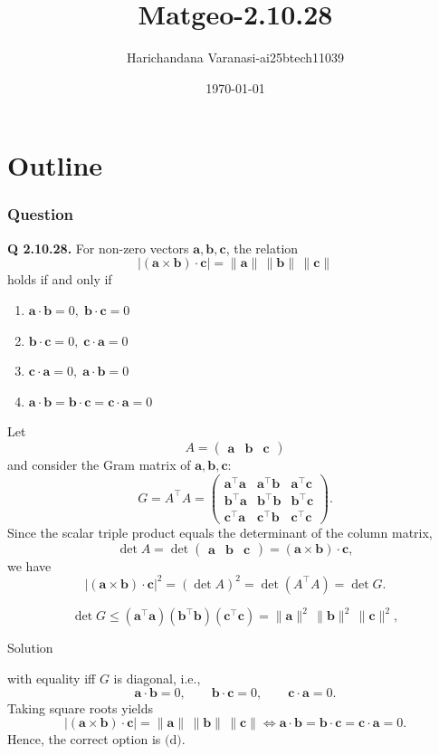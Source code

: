 \documentclass{beamer}
\title{Matgeo-2.10.28}
\author{Harichandana Varanasi-ai25btech11039}
\date{\today}
\theoremstyle{remark}
\providecommand{\abs}[1]{\left\vert#1\right\vert}
\newcommand{\myvec}[1]{\ensuremath{\begin{pmatrix}#1\end{pmatrix}}}
\let\vec\mathbf
\begin{document}
\begin{frame}
\titlepage
\end{frame}

\section*{Outline}

\begin{frame}
\frametitle{Question}
\textbf{Q 2.10.28.}
For non-zero vectors $\vec a,\vec b,\vec c$, the relation
\[
\bigl|(\vec a\times \vec b)\cdot \vec c\bigr|=\|\vec a\|\,\|\vec b\|\,\|\vec c\|
\]
holds if and only if
\begin{enumerate}
  \item $\vec a\cdot\vec b=0,\; \vec b\cdot\vec c=0$
  \item $\vec b\cdot\vec c=0,\; \vec c\cdot\vec a=0$
  \item $\vec c\cdot\vec a=0,\; \vec a\cdot\vec b=0$
  \item $\vec a\cdot\vec b=\vec b\cdot\vec c=\vec c\cdot\vec a=0$
\end{enumerate}


\end{frame}
%
\begin{frame}

\begin{solution}
Let 
\[
A=\myvec{\vec{a}&\vec{b}&\vec{c}}
\]
and consider the Gram matrix of $\vec{a},\vec{b},\vec{c}$:
\[
G=A^\top A
=\myvec{
\vec a^\top\vec a & \vec a^\top\vec b & \vec a^\top\vec c\\
\vec b^\top\vec a & \vec b^\top\vec b & \vec b^\top\vec c\\
\vec c^\top\vec a & \vec c^\top\vec b & \vec c^\top\vec c }.
\]
Since the scalar triple product equals the determinant of the column matrix,
\[
\det A=\det\myvec{\vec a&\vec b&\vec c}=(\vec a\times\vec b)\cdot\vec c,
\]
we have
\[
\abs{(\vec a\times\vec b)\cdot\vec c}^{2}
=(\det A)^2
=\det(A^\top A)
=\det G.
\]

\[
\det G\le
(\vec a^\top\vec a)(\vec b^\top\vec b)(\vec c^\top\vec c)
=\|\vec a\|^2\,\|\vec b\|^2\,\|\vec c\|^2,
\]
\end{solution}
\end{frame}
\begin{frame}{Solution}
 \begin{solution}
     

with equality iff $G$ is diagonal, i.e.,
\[
\vec a\cdot\vec b=0,\qquad
\vec b\cdot\vec c=0,\qquad
\vec c\cdot\vec a=0.
\]
Taking square roots yields
\[
\abs{(\vec a\times\vec b)\cdot\vec c}
=\|\vec a\|\,\|\vec b\|\,\|\vec c\|
\iff
\vec a\cdot\vec b=\vec b\cdot\vec c=\vec c\cdot\vec a=0.
\]
Hence, the correct option is \(\boxed{\text{(d)}}\).
\end{solution}

\end{frame}
\end{document}
